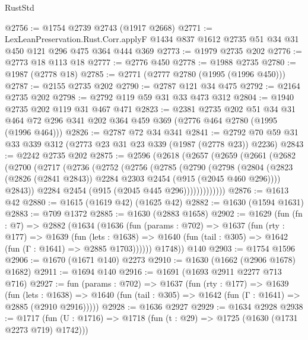 \begin{lexlean}{RustStd}
\begin{coremodule}
@2756 := @1754 @2739 @2743 (@1917 @2668)
@2771 := LexLeanPreservation.Rust.Corr.applyF
    @1434
    @837
    @1612
    @2735
    @51
    @34
    @31
    @450
    @121
    @296
    @475
    @364
    @444
    @369
@2773 := @1979 @2735 @202
@2776 := @2773 @18 @113 @18
@2777 := @2776 @450
@2778 := @1988 @2735
@2780 := @1987 (@2778 @18)
@2785 := @2771 (@2777 @2780 (@1995 (@1996 @450)))
@2787 := @2155 @2735 @202
@2790 := @2787 @121 @34 @475
@2792 := @2164 @2735 @202
@2798 := @2792 @119 @59 @31 @33 @473 @312
@2804 := @1940 @2735 @202 @119 @31 @467 @471
@2823 := @2381
    @2735
    @202
    @51
    @34
    @31
    @464
    @72
    @296
    @341
    @202
    @364
    @459
    @369
    (@2776 @464 @2780 (@1995 (@1996 @464)))
@2826 := @2787 @72 @34 @341
@2841 := @2792 @70 @59 @31 @33 @339 @312 (@2773 @23 @31 @23 @339 (@1987 (@2778 @23)) @2236)
@2843 := @2242 @2735 @202
@2875 := @2596
    (@2618
      (@2657
        (@2659
          (@2661
            (@2682
              (@2700
                (@2717
                  (@2736
                    (@2752
                      (@2756
                        (@2785
                          (@2790
                            (@2798
                              (@2804
                                (@2823
                                  (@2826 (@2841 @2843))
                                  @2284
                                  @2303
                                  @2454
                                  (@915 (@2045 @460 @296))))
                              @2843))
                          @2284
                          @2454
                          (@915 (@2045 @445 @296)))))))))))))
@2876 := @1613 @42
@2880 := @1615 (@1619 @42) (@1625 @42)
@2882 := @1630 (@1594 @1631)
@2883 := @709 @1372
@2885 := @1630 (@2883 @1658)
@2902 := @1629
    (fun (fn : @7) =>
    @2882
      (@1634
        (@1636
          (fun (params : @702) =>
          @1637
            (fun (rty : @177) =>
            @1639
              (fun (lets : @1638) =>
              @1640 (fun (tail : @305) => @1642 (fun (Γ : @1641) => @2885 @1703))))))
        @1748))
    @140
@2903 := @1754 @1596
@2906 := @1670 (@1671 @140) @2273
@2910 := @1630 (@1662 (@2906 @1678) @1682)
@2911 := @1694 @140
@2916 := @1691 (@1693 @2911 @2277 @713 @716)
@2927 := fun (params : @702) =>
  @1637
    (fun (rty : @177) =>
    @1639
      (fun (lets : @1638) =>
      @1640 (fun (tail : @305) => @1642 (fun (Γ : @1641) => @2885 (@2910 @2916)))))
@2928 := @1636 @2927
@2929 := @1634 @2928
@2938 := @1717 (fun (U : @1716) => @1718 (fun (t : @29) => @1725 (@1630 (@1731 @2273 @719) @1742)))

\end{coremodule}
\end{lexlean}
